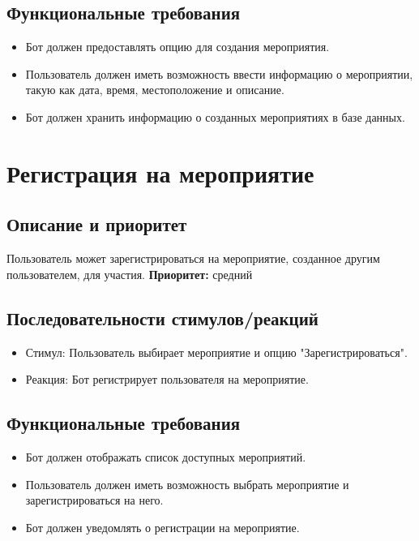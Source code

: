 \documentclass{scrreprt}
\begin{document}
\subsection{Функциональные требования}
\begin{itemize}
    \item Бот должен предоставлять опцию для создания мероприятия.
    \item Пользователь должен иметь возможность ввести информацию о мероприятии, такую как дата, время, местоположение и описание.
    \item Бот должен хранить информацию о созданных мероприятиях в базе данных.
\end{itemize}

\section{Регистрация на мероприятие}

\subsection{Описание и приоритет}
Пользователь может зарегистрироваться на мероприятие, созданное другим пользователем, для участия.
\newline
\textbf{Приоритет:} средний

\subsection{Последовательности стимулов/реакций}
\begin{itemize}
    \item Стимул: Пользователь выбирает мероприятие и опцию "Зарегистрироваться".
    \item Реакция: Бот регистрирует пользователя на мероприятие.
\end{itemize}

\subsection{Функциональные требования}
\begin{itemize}
    \item Бот должен отображать список доступных мероприятий.
    \item Пользователь должен иметь возможность выбрать мероприятие и зарегистрироваться на него.
    \item Бот должен уведомлять о регистрации на мероприятие.
\end{itemize}
\end{document}
